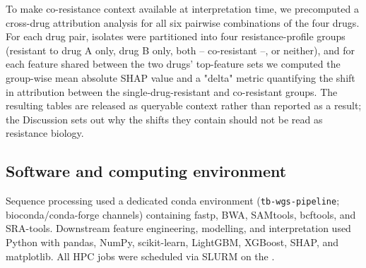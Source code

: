 To make co-resistance context available at interpretation time, we precomputed a cross-drug attribution analysis for all six pairwise combinations of the four drugs. For each drug pair, isolates were partitioned into four resistance-profile groups (resistant to drug A only, drug B only, both -- co-resistant --, or neither), and for each feature shared between the two drugs' top-feature sets we computed the group-wise mean absolute SHAP value and a "delta" metric quantifying the shift in attribution between the single-drug-resistant and co-resistant groups. The resulting tables are released as queryable context rather than reported as a result; the Discussion sets out why the shifts they contain should not be read as resistance biology.

\subsection{Software and computing environment}

Sequence processing used a dedicated conda environment (\texttt{tb-wgs-pipeline}; bioconda/conda-forge channels) containing fastp, BWA, SAMtools, bcftools, and SRA-tools. Downstream feature engineering, modelling, and interpretation used Python with pandas, NumPy, scikit-learn, LightGBM, XGBoost, SHAP, and matplotlib. All HPC jobs were scheduled via SLURM on the .
